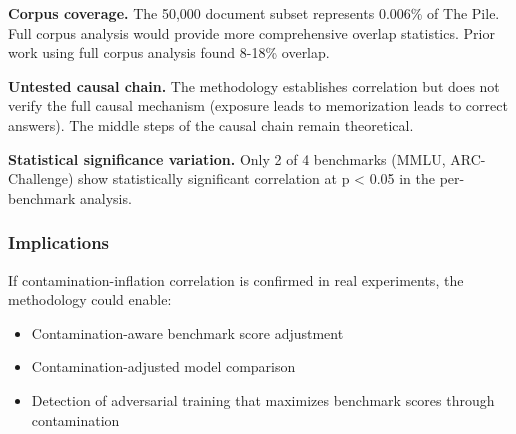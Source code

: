 \textbf{Corpus coverage.} The 50,000 document subset represents 0.006\% of The Pile. Full corpus analysis would provide more comprehensive overlap statistics. Prior work \citep{yang2023rethinking} using full corpus analysis found 8-18\% overlap.

\textbf{Untested causal chain.} The methodology establishes correlation but does not verify the full causal mechanism (exposure leads to memorization leads to correct answers). The middle steps of the causal chain remain theoretical.

\textbf{Statistical significance variation.} Only 2 of 4 benchmarks (MMLU, ARC-Challenge) show statistically significant correlation at p < 0.05 in the per-benchmark analysis.

\subsubsection{Implications}

If contamination-inflation correlation is confirmed in real experiments, the methodology could enable:
\begin{itemize}
\item Contamination-aware benchmark score adjustment
\item Contamination-adjusted model comparison
\item Detection of adversarial training that maximizes benchmark scores through contamination
\end{itemize}

